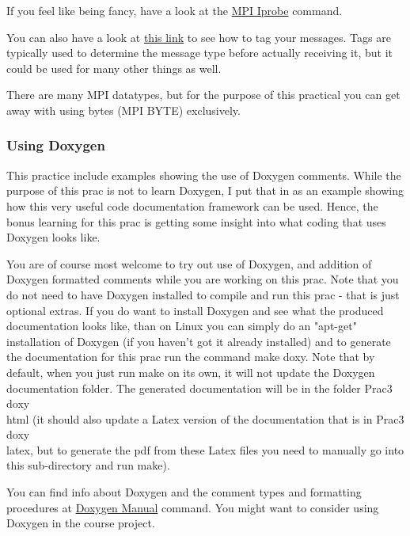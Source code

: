 If you feel like being fancy, have a look at the \href{https://mpi.deino.net/mpi_functions/MPI_Iprobe.html}{MPI Iprobe} command. 

You can also have a look at \href{http://stackoverflow.com/questions/12637550/using-mpibyte-to-receive-any-data-type}{this link} to see how to tag your messages. Tags are typically used to determine the message type before actually receiving it, but it could be used for many other things as well. 

There are many MPI datatypes, but for the purpose of this practical you can get away with using bytes (MPI BYTE) exclusively.

\subsubsection{Using Doxygen}

This practice include examples showing the use of Doxygen comments. While the purpose of this prac is not to learn Doxygen, I put that in as an example showing how this very useful code documentation framework can be used. Hence, the bonus learning for this prac is getting some insight into what coding that uses Doxygen looks like.

You are of course most welcome to try out use of Doxygen, and addition of Doxygen formatted comments while you are working on this prac. Note that you do not need to have Doxygen installed to compile and run this prac - that is just optional extras. 
If you do want to install Doxygen and see what the produced documentation looks like, than on Linux you can simply do an "apt-get" installation of Doxygen (if you haven't got it already installed) and to generate the documentation for this prac run the command make doxy. Note that by default, when you just run make on its own, it will not update the Doxygen documentation folder. The generated documentation will be in the folder Prac3\\doxy\\html (it should also update a Latex version of the documentation that is in Prac3\\doxy\\latex, but to generate the pdf from these Latex files you need to manually go into this sub-directory and run make).

You can find info about Doxygen and the comment types and formatting procedures at \href{https://www.doxygen.nl/index.html}{Doxygen Manual} command. You might want to consider using Doxygen in the course project.


